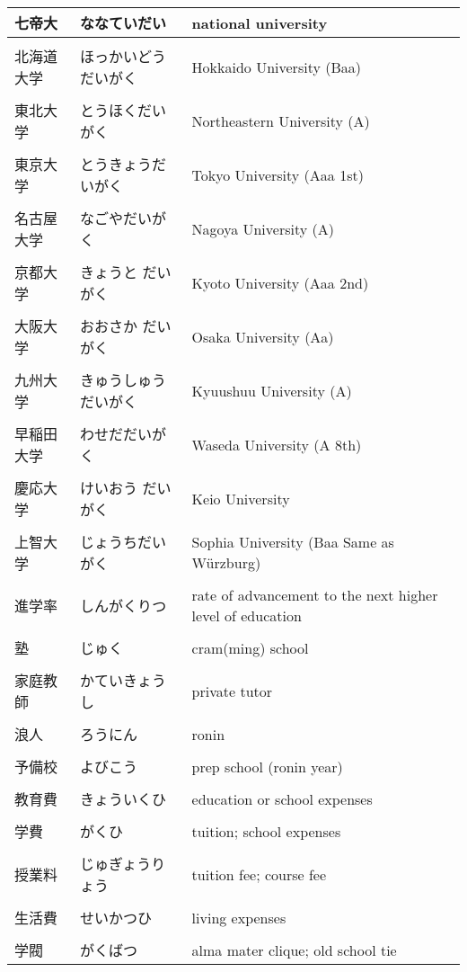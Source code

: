 \documentclass{article}
\begin{document}
\begin{tabular}{ l | p{6.7cm} | p{7.5cm} }
七帝大 &   ななていだい & national university  \\ \hline \\[-1em]
北海道大学 & ほっかいどうだいがく & Hokkaido University (Baa)\\ \hline \\[-1em]
東北大学 &  とうほくだいがく  & Northeastern University (A)\\ \hline \\[-1em]
東京大学 & とうきょうだいがく & Tokyo University (Aaa 1st)\\ \hline \\[-1em]
名古屋大学 &  なごやだいがく & Nagoya University (A)\\ \hline \\[-1em]
京都大学 &  きょうと だいがく& Kyoto University (Aaa 2nd)\\ \hline \\[-1em]
大阪大学 &  おおさか だいがく& Osaka University (Aa)\\ \hline \\[-1em]
九州大学 &  きゅうしゅうだいがく& Kyuushuu University (A)\\ \hline \\[-1em]
早稲田大学 & わせだだいがく& Waseda University (A 8th)\\ \hline \\[-1em]
慶応大学 &  けいおう だいがく& Keio University \\ \hline \\[-1em]
上智大学 &  じょうちだいがく& Sophia University (Baa {Same as Würzburg})\\ \hline \\[-1em]
進学率 &  しんがくりつ  & rate of advancement to the next higher level of education\\ \hline \\[-1em]
塾 & じゅく &  cram(ming) school \\ \hline \\[-1em]
家庭教師 &  かていきょうし  & private tutor\\ \hline \\[-1em]
浪人 &  ろうにん & ronin \\ \hline \\[-1em]
予備校 &  よびこう & prep school (ronin year) \\ \hline \\[-1em]
教育費 &  きょういくひ & education or school expenses\\ \hline \\[-1em]
学費  &  がくひ & tuition; school expenses\\ \hline \\[-1em]
授業料 &  じゅぎょうりょう & tuition fee; course fee\\ \hline \\[-1em]
生活費 &  せいかつひ & living expenses \\ \hline \\[-1em]
学閥 &  がくばつ & alma mater clique; old school tie %
\end{tabular}
\end{document}
